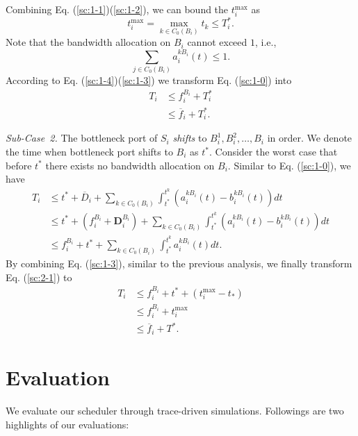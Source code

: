 \documentclass[10pt, conference, letterpaper]{IEEEtran}
\begin{document}
\begin{IEEEproof}
\begin{equation}
\end{equation}
Combining Eq. (\ref{sc:1-1})(\ref{sc:1-2}), we can bound the $t_i^{\text{max}}$ as
\begin{equation}\label{sc:1-4}
	t_i^{\text{max}} = \max_{k \in C_0(B_i)} t_k \leq T_i^*.
\end{equation}
Note that the bandwidth allocation on $B_i$ cannot exceed $1$, i.e.,
\begin{equation}\label{sc:1-3}
	\sum_{j \in C_0(B_i)} a_i^{kB_i}(t) \leq 1.
\end{equation}
According to Eq. (\ref{sc:1-4})(\ref{sc:1-3}) we transform Eq. (\ref{sc:1-0}) into
\begin{equation}
	\begin{aligned}
		T_i & \leq f_i^{B_i} + T_i^*\\
		& \leq \overline{f}_i + T_i^*.
	\end{aligned}
\end{equation}

\emph{Sub-Case~2.} The bottleneck port of $S_i$ \emph{shifts} to $B_i^1,B_i^2,\dots,B_i$ in order. We denote the time when bottleneck port shifts to $B_i$ as $t^*$. Consider the worst case that before $t^*$ there exists no bandwidth allocation on $B_i$. Similar to Eq. (\ref{sc:1-0}), we have
\begin{equation}\label{sc:2-1}
	\begin{aligned}
		T_i & \leq t^* + \overline{D}_i + \sum_{k \in C_0(B_i)}\int_{t^*}^{t^k}(a_i^{kB_i}(t)-b_i^{kB_i}(t))dt\\
		& \leq t^* + (f_i^{B_i} + \mathbf{D}_i^{B_i}) + \sum_{k \in C_0(B_i)}\int_{t^*}^{t^k}(a_i^{kB_i}(t)-b_i^{kB_i}(t))dt\\
		& \leq f_i^{B_i} + t^* + \sum_{k \in C_0(B_i)}\int_{t^*}^{t^k} a_i^{kB_i}(t)dt.
	\end{aligned}
\end{equation}
By combining Eq. (\ref{sc:1-3}), similar to the previous analysis, we finally transform Eq. (\ref{sc:2-1}) to
\begin{equation}
	\begin{aligned}
		T_i & \leq f_i^{B_i} + t^* + (t_i^{\text{max}} - t_*)\\
		& \leq f_i^{B_i} + t_i^{\text{max}}\\
		& \leq \overline{f}_i + T^*.
	\end{aligned}
\end{equation}
\end{IEEEproof}

\section{Evaluation}
We evaluate our scheduler through trace-driven simulations. Followings are two highlights of our evaluations:%
\end{document}
